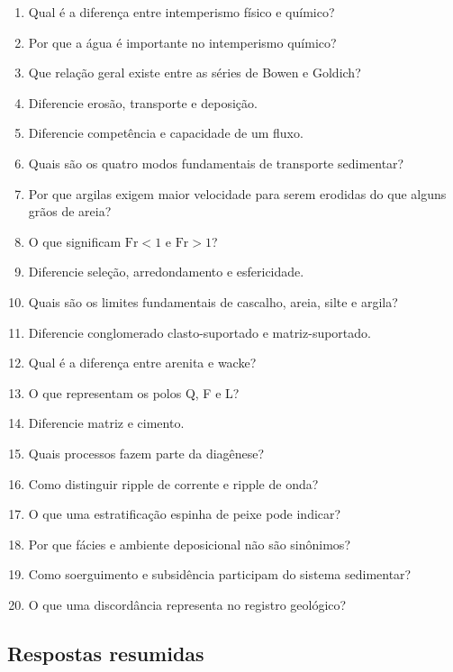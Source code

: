 \begin{enumerate}
  \item Qual é a diferença entre intemperismo físico e químico?
  \item Por que a água é importante no intemperismo químico?
  \item Que relação geral existe entre as séries de Bowen e Goldich?
  \item Diferencie erosão, transporte e deposição.
  \item Diferencie competência e capacidade de um fluxo.
  \item Quais são os quatro modos fundamentais de transporte sedimentar?
  \item Por que argilas exigem maior velocidade para serem erodidas do que alguns grãos de areia?
  \item O que significam \(\mathrm{Fr}<1\) e \(\mathrm{Fr}>1\)?
  \item Diferencie seleção, arredondamento e esfericidade.
  \item Quais são os limites fundamentais de cascalho, areia, silte e argila?
  \item Diferencie conglomerado clasto-suportado e matriz-suportado.
  \item Qual é a diferença entre arenita e wacke?
  \item O que representam os polos Q, F e L?
  \item Diferencie matriz e cimento.
  \item Quais processos fazem parte da diagênese?
  \item Como distinguir ripple de corrente e ripple de onda?
  \item O que uma estratificação espinha de peixe pode indicar?
  \item Por que fácies e ambiente deposicional não são sinônimos?
  \item Como soerguimento e subsidência participam do sistema sedimentar?
  \item O que uma discordância representa no registro geológico?
\end{enumerate}

\subsection{Respostas resumidas}


